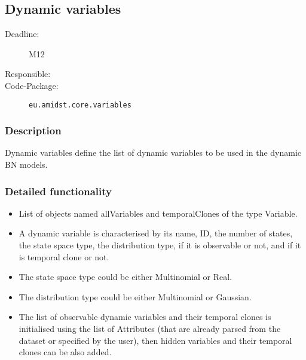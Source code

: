 \subsection{Dynamic variables}
\label{Functionality:ID}

\begin{description}
\item[Deadline:] M12
\item[Responsible:]
\item[Code-Package:] \texttt{eu.amidst.core.variables}
\end{description}

\subsubsection*{Description}

Dynamic variables define the list of dynamic variables to be used in the dynamic BN models.

\subsubsection*{Detailed functionality}

\begin{itemize}
\item List of objects named allVariables and temporalClones of the type Variable. 

\item A dynamic variable is characterised by its name, ID, the number of states, the state space type, the distribution type, if it is observable or not, and if it is temporal clone or not.

\item The state space type could be either Multinomial or Real.

\item The distribution type could be either Multinomial or Gaussian.

\item The list of observable dynamic variables and their temporal clones is initialised using the list of Attributes (that are already parsed from the dataset or specified by the user), then hidden variables and their temporal clones can be also added.

\end{itemize}